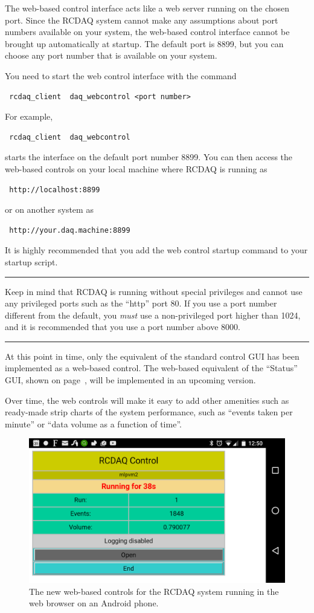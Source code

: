 \documentclass{article}[11pt]
\newcommand{\warning}[1]{
\vskip 3mm
\begin{minipage}[c]{\linewidth}
\hrule
\vskip 2mm
\begin{minipage}[c]{0.1\linewidth}
{\Huge\color{red}{\fontencoding{U}\fontfamily{futs}\selectfont\char 66\relax}}
\end{minipage}
\begin{minipage}[c]{0.9\linewidth}
#1
\end{minipage}
\vskip 2mm
\hrule
\end{minipage}
\vskip 3mm
}
\begin{document}
The web-based control interface acts like a web server running on the
chosen port. Since the RCDAQ system cannot make any assumptions about
port numbers available on your system, the web-based control interface
cannot be brought up automatically at startup. The default port is
8899, but you can choose any port number that is available on your
system.

You need to start the web control interface with the command
\begin{verbatim}
 rcdaq_client  daq_webcontrol <port number> 
\end{verbatim}

For example,
\begin{verbatim}
 rcdaq_client  daq_webcontrol
\end{verbatim}
starts the interface on the default port number 8899. You can then access the
web-based controls on your local machine where RCDAQ is running as
\begin{verbatim}
 http://localhost:8899
\end{verbatim}
or on another system as
\begin{verbatim}
 http://your.daq.machine:8899
\end{verbatim}

It is highly recommended that you add the web control startup command 
to your startup script.  

\warning{Keep in mind that RCDAQ is running without special privileges and
cannot use any privileged ports such as the ``http'' port 80. If you
use a port number different from the default, you \emph{must} use a
non-privileged port higher than 1024, and it is recommended that you
use a port number above 8000.}

At this point in time, only the equivalent of the standard control GUI
has been implemented as a web-based control. The web-based equivalent
of the ``Status'' GUI, shown on page~\pageref{rcdaqstatus}, will be
implemented in an upcoming version.

Over time, the web controls will make it easy to add other amenities
such as ready-made strip charts of the system performance, such as
``events taken per minute'' or ``data volume as a function of time''.

\begin{figure}[htb]
  \begin{center}
    \includegraphics[width=0.85\columnwidth]{android.png} 
  \end{center}
  \caption{\label{android}The new web-based controls for the RCDAQ system
    running in the web browser on an Android phone.}
\end{figure}
\end{document}
